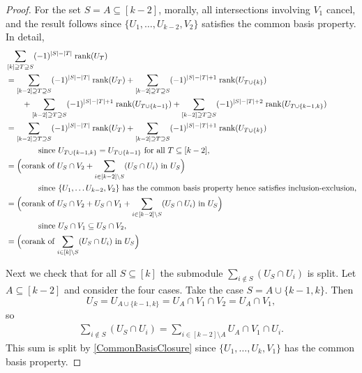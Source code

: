 \documentclass[a4paper]{amsart}
\numberwithin{theoremcounter}{section}
\theoremstyle{definition}
\theoremstyle{remark}
\newcommand{\mr}[1]{{\rm #1}}
\newcommand{\rank}{\mr{rank}}
\begin{document}
\begin{proof}
 


 For the set $S=A \subseteq [k-2]$, morally, all intersections involving $V_1$ cancel, and the result follows since  $\{U_1, \dots, U_{k-2}, V_2\}$ satisfies the common basis property. In detail, 
    \begin{align*}
 & \sum_{[k] \supseteq T\supseteq S} (-1)^{|S|-|T|} \; \rank(U_T)  \\ 
  & =   \sum_{[k-2] \supseteq T\supseteq S} (-1)^{|S|-|T|} \; \rank(U_{T})  +  \sum_{[k-2] \supseteq T\supseteq S} (-1)^{|S|-|T|+1} \; \rank(U_{T \cup \{k\}})  \\ & \qquad +  \sum_{[k-2] \supseteq T\supseteq S} (-1)^{|S|-|T|+1} \; \rank(U_{T \cup \{k-1\}})  +  \sum_{[k-2] \supseteq T\supseteq S} (-1)^{|S|-|T|+2} \; \rank(U_{T \cup \{k-1, k\}}) \\ 
    & =   \sum_{[k-2] \supseteq T\supseteq S} (-1)^{|S|-|T|} \; \rank(U_{T})  +  \sum_{[k-2] \supseteq T\supseteq S} (-1)^{|S|-|T|+1} \; \rank(U_{T \cup \{k\}})  \\
    & \qquad \qquad  \text{since $U_{T \cup \{k-1, k\}} = U_{T \cup \{k-1\}}$ for all $T \subseteq [k-2]$}, \\ 
    & = \Big(\text{corank of $U_S \cap V_2 + \sum_{i \in [k-2]\setminus S} (U_S \cap U_i) $ in $U_S$}\Big) \\ & \qquad \qquad \text{since $\{U_1, \dots U_{k-2}, V_2\}$ has the common basis property hence satisfies inclusion-exclusion}, \\ 
        & = \Big(\text{corank of $U_S \cap V_2 + U_S \cap V_1 + \sum_{i \in [k-2]\setminus S} (U_S \cap U_i) $ in $U_S$}\Big)  \\ & \qquad \qquad \text{since $U_S \cap V_1 \subseteq U_S \cap V_2$}, \\
        &= \Big(\text{corank of $\sum_{i \in [k]\setminus S} (U_S \cap U_i) $ in $U_S$}\Big) 
  \end{align*}

   
 
 Next we check that for all $S \subseteq [k]$ the submodule $\sum_{i \notin S} (U_S \cap U_i)$ is split.  Let $A \subseteq [k-2]$ and consider the four cases. 
Take the case $S=A \cup \{k-1, k\}$. Then $$U_S = U_{A \cup \{k-1,k\} } = U_A \cap V_1 \cap V_2 = U_A \cap V_1,$$  so 
 \begin{align*}
 \sum_{i \notin S} (U_S \cap U_i)  = \sum_{ i \in [k-2] \setminus A } U_A \cap V_1 \cap U_i.
 \end{align*}
 This sum is split by \autoref{CommonBasisClosure} since $\{U_1, \dots, U_k, V_1\}$ has the common basis property. 
 

\end{proof}
\end{document}
